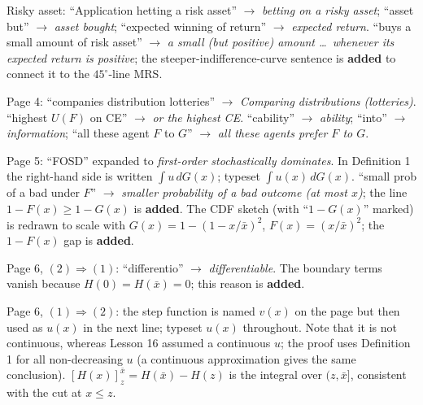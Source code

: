 \documentclass[11pt]{article}
\begin{document}
\begin{transcriptnotes}
  \item Risky asset: ``Application hetting a risk asset'' $\to$ \emph{betting on a
        risky asset}; ``asset but'' $\to$ \emph{asset bought}; ``expected winning of
        return'' $\to$ \emph{expected return}. ``buys a small amount of risk
        asset'' $\to$ \emph{a small (but positive) amount \ldots\ whenever its
        expected return is positive}; the steeper-indifference-curve sentence is
        \textbf{added} to connect it to the $45^\circ$-line MRS.
  \item Page 4: ``companies distribution lotteries'' $\to$ \emph{Comparing
        distributions (lotteries)}. ``highest $U(F)$ on CE'' $\to$ \emph{or the
        highest CE}. ``cability'' $\to$ \emph{ability}; ``into'' $\to$
        \emph{information}; ``all these agent $F$ to $G$'' $\to$ \emph{all these
        agents prefer $F$ to $G$}.
  \item Page 5: ``FOSD'' expanded to \emph{first-order stochastically dominates}. In
        Definition 1 the right-hand side is written $\int u\,dG(x)$; typeset
        $\int u(x)\,dG(x)$. ``small prob of a bad under $F$'' $\to$ \emph{smaller
        probability of a bad outcome (at most $x$)}; the line
        $1-F(x)\ge1-G(x)$ is \textbf{added}. The CDF sketch (with ``$1-G(x)$''
        marked) is redrawn to scale with $G(x)=1-(1-x/\bar x)^2$,
        $F(x)=(x/\bar x)^2$; the $1-F(x)$ gap is \textbf{added}.
  \item Page 6, $(2)\Rightarrow(1)$: ``differentio'' $\to$ \emph{differentiable}.
        The boundary terms vanish because $H(0)=H(\bar x)=0$; this reason is
        \textbf{added}.
  \item Page 6, $(1)\Rightarrow(2)$: the step function is named $v(x)$ on the page but
        then used as $u(x)$ in the next line; typeset $u(x)$ throughout. Note that
        it is not continuous, whereas Lesson 16 assumed a continuous $u$; the proof
        uses Definition 1 for all non-decreasing $u$ (a continuous approximation
        gives the same conclusion). $[H(x)]_z^{\bar x}=H(\bar x)-H(z)$ is the
        integral over $(z,\bar x]$, consistent with the cut at $x\le z$.
\end{transcriptnotes}
\end{document}
